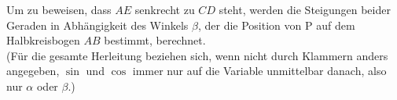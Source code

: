 \setlength{\mathindent}{4cm}

\newcommand{\Koordinaten}{
	\coordinate (m) at (0,0);
	\coordinate (a) at (-1,0);
	\coordinate (b) at (1,0);
	\coordinate (c) at (-0.5,0.866);
	\coordinate (p) at (0.5,0.866);
	\coordinate (e) at (0.866,0.5);
}
\newcommand{\Halbkreis}{
	\begin{scope}
		\clip (a) rectangle (1,1);
		\draw[black] (m) circle(1);
		\draw[black] (a) -- (b);
	\end{scope}
}

\newcommand{\Strecke}[1]{\overline{\mathit{#1}}}

\newcommand{\sina}{\sin\alpha}
\newcommand{\cosa}{\cos\alpha}
\newcommand{\sinb}{\sin\beta}
\newcommand{\cosb}{\cos\beta}

Um zu beweisen, dass $AE$ senkrecht zu $CD$ steht, werden die Steigungen beider Geraden in Abhängigkeit des Winkels $\beta$, der die Position von P auf dem Halbkreisbogen $AB$ bestimmt, berechnet.
\\[10pt]
(Für die gesamte Herleitung beziehen sich, wenn nicht durch Klammern anders angegeben, $\sin$ und $\cos$ immer nur auf die Variable unmittelbar danach, also nur $\alpha$ oder $\beta$.)

